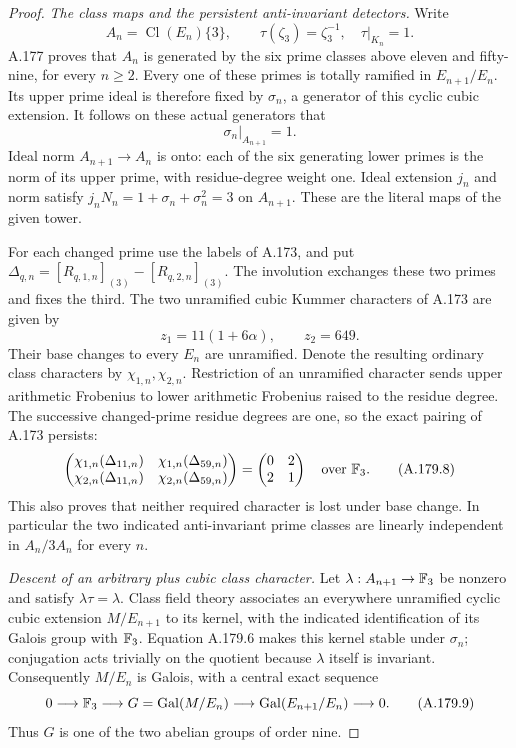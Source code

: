 \begin{proof}
\emph{The class maps and the persistent anti-invariant detectors.}
Write
\[
 A_n=\operatorname{Cl}(E_n)\{3\},\qquad
 \tau(\zeta_3)=\zeta_3^{-1},\quad \tau|_{K_n}=1.
\tag{A.179.5}
\]
A.177 proves that \(A_n\) is generated by the six prime classes
above eleven and fifty-nine, for every \(n\ge2\).
Every one of these primes is totally ramified in
\(E_{n+1}/E_n\).  Its upper prime ideal is therefore fixed by
\(\sigma_n\), a generator of this cyclic cubic extension.
It follows on these actual generators that
\[
                    \sigma_n|_{A_{n+1}}=1.
\tag{A.179.6}
\]
Ideal norm \(A_{n+1}\to A_n\) is onto: each of the six generating
lower primes is the norm of its upper prime, with residue-degree
weight one.  Ideal extension \(j_n\) and norm satisfy
\(j_nN_n=1+\sigma_n+\sigma_n^2=3\) on \(A_{n+1}\).
These are the literal maps of the given tower.

For each changed prime use the labels of A.173, and put
\(\Delta_{q,n}=[R_{q,1,n}]_{(3)}-[R_{q,2,n}]_{(3)}\).
The involution exchanges these two primes and fixes the third.
The two unramified cubic Kummer characters of A.173 are given by
\[
                       z_1=11(1+6\alpha),\qquad z_2=649.
\tag{A.179.7}
\]
Their base changes to every \(E_n\) are unramified.  Denote the
resulting ordinary class characters by \(\chi_{1,n},\chi_{2,n}\).
Restriction of an unramified character sends upper arithmetic
Frobenius to lower arithmetic Frobenius raised to the residue degree.
The successive changed-prime residue degrees are one, so the exact
pairing of A.173 persists:
\[
 \begin{pmatrix}
 \chi_{1,n}(\Delta_{11,n})&\chi_{1,n}(\Delta_{59,n})\\
 \chi_{2,n}(\Delta_{11,n})&\chi_{2,n}(\Delta_{59,n})
 \end{pmatrix}
                 =\begin{pmatrix}0&2\\2&1\end{pmatrix}
                 \quad\text{over }\mathbb F_3.
\tag{A.179.8}
\]
This also proves that neither required character is lost under
base change.  In particular the two indicated anti-invariant prime
classes are linearly independent in \(A_n/3A_n\) for every \(n\).

\emph{Descent of an arbitrary plus cubic class character.}
Let
\(\lambda:A_{n+1}\to\mathbb F_3\) be nonzero and satisfy
\(\lambda\tau=\lambda\).
Class field theory associates an everywhere unramified cyclic
cubic extension \(M/E_{n+1}\) to its kernel, with the indicated
identification of its Galois group with \(\mathbb F_3\).
Equation A.179.6 makes this kernel stable under \(\sigma_n\);
conjugation acts trivially on the quotient because \(\lambda\)
itself is invariant.  Consequently \(M/E_n\) is Galois, with
a central exact sequence
\[
 0\longrightarrow \mathbb F_3
   \longrightarrow G=\operatorname{Gal}(M/E_n)
   \longrightarrow\operatorname{Gal}(E_{n+1}/E_n)
   \longrightarrow0.
\tag{A.179.9}
\]
Thus \(G\) is one of the two abelian groups of order nine.


\end{proof}
